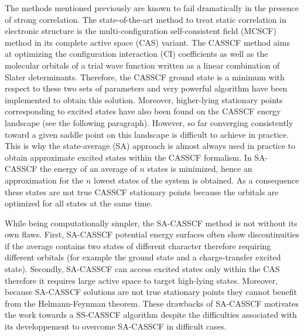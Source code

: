 \documentclass[aps,prb,reprint,showkeys,superscriptaddress]{revtex4-1}
\begin{document}
The methods mentioned previously are known to fail dramatically in the presence of strong correlation. \cite{Jensen_2017}
The state-of-the-art method to treat static correlation in electronic structure is the multi-configuration self-consistent field (MCSCF) method in its complete active space (CAS) variant. \cite{Roos_2016}
The CASSCF method aims at optimizing the configuration interaction (CI) coefficients as well as the molecular orbitals of a trial wave function written as a linear combination of Slater determinants. \cite{Helgaker_2000,Roos_2016}
Therefore, the CASSCF ground state is a minimum with respect to these two sets of parameters and very powerful algorithm have been implemented to obtain this solution. \cite{Roos_1980,Werner_1985,Sun_2017,Kreplin_2019,Kreplin_2020}
Moreover, higher-lying stationary points corresponding to excited states have also been found on the CASSCF energy landscape (see the following paragraph).
However, so far converging consistently toward a given saddle point on this landscape is difficult to achieve in practice.
This is why the state-average (SA) approach is almost always used in practice to obtain approximate excited states within the CASSCF formalism.
In SA-CASSCF the energy of an average of $n$ states is minimized, hence an approximation for the $n$ lowest states of the system is obtained.
As a consequence these states are not true CASSCF stationary points because the orbitals are optimized for all states at the same time.

While being computationally simpler, the SA-CASSCF method is not without its own flaws. \cite{Zaitsevskii_1994,Helmich-Paris_2019}
First, SA-CASSCF potential energy surfaces often show discontinuities if the average contains two states of different character therefore requiring different orbitals (for example the ground state and a charge-transfer excited state). \cite{Zaitsevskii_1994}
Secondly, SA-CASSCF can access excited states only within the CAS therefore it requires large active space to target high-lying states.
Moreover, because SA-CASSCF solutions are not true stationary points they cannot benefit from the Helmann-Feynman theorem.
These drawbacks of SA-CASSCF motivates the work towards a SS-CASSCF algorithm despite the difficulties associated with its developpement to overcome SA-CASSCF in difficult cases.
\end{document}
